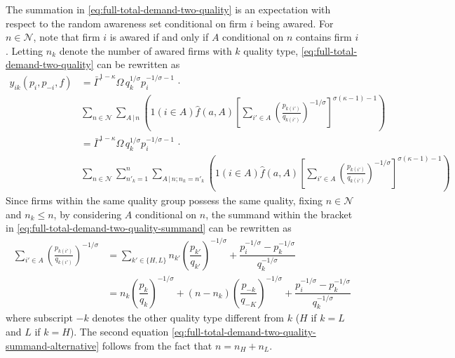 \documentclass[12pt]{article}
\begin{document}
The summation in \eqref{eq:full-total-demand-two-quality} is an expectation with respect to the random awareness set conditional on firm $i$ being awared. For $n \in \mathcal{N}$, note that firm $i$ is awared if and only if $A$ conditional on $n$ contains firm $i$. Letting $n_k$ denote the number of awared firms with $k$ quality type, \eqref{eq:full-total-demand-two-quality} can be rewritten as
\begin{align}
	y_{ik}(p_i, p_{-i}, f) &= \bar{\Gamma}^{1-\kappa}\Omega \, q_k^{1/\sigma}p_i^{-1/\sigma - 1}\, \cdot \\ 
	& \sum_{n \in \mathcal{N} }  \sum_{{A}\,|\,n}\left( 1( i \in A ) \hat{f}(a,A)\left[\sum_{i'\in A}\left( \frac{p_{k(i')}}{q_{k(i')}}\right)^{-1/\sigma}\right]^{\sigma (\kappa - 1)-1}\right)  \\
	&= \bar{\Gamma}^{1-\kappa}\Omega \, q_k^{1/\sigma}p_i^{-1/\sigma - 1}\, \cdot \\ 
	&\sum_{n \in \mathcal{N} } \sum_{n'_k =1}^n \sum_{{A}\,|\,n; n_k = n'_k}\left( 1( i \in A ) \hat{f}(a,A)\left[\sum_{i'\in A}\left( \frac{p_{k(i')}}{q_{k(i')}}\right)^{-1/\sigma}\right]^{\sigma (\kappa - 1)-1}\right)  
	\label{eq:full-total-demand-two-quality-summand}
\end{align}
Since firms within the same quality group possess the same quality, fixing $n \in \mathcal{N}$ and $n_k \leq n$, by considering $A$ conditional on $n$, the summand within the bracket in \cref{eq:full-total-demand-two-quality-summand} can be rewritten as 
\begin{align}
\sum_{i'\in A}\left( \frac{p_{k(i')}}{q_{k(i')}}\right)^{-1/\sigma} &= \sum_{k' \in \{H, L\} } n_{k'} \left( \dfrac{p_{k'}}{q_{k'}}  \right)^{-1/\sigma} +   
\dfrac{p_i^{-1/\sigma} - p^{-1/\sigma}_{k} }{ q_k^{-1/\sigma }} \\
&= n_k \left( \dfrac{p_{k}}{q_{k}}   \right)^{-1/\sigma} +  
(n - n_k) \left( \dfrac{p_{-k}}{q_{-K}}   \right)^{-1/\sigma} +
\dfrac{p_i^{-1/\sigma} - p^{-1/\sigma}_{k} }{ q_k^{-1/\sigma }}  \label{eq:full-total-demand-two-quality-summand-alternative}
\end{align}
where subscript $-k$ denotes the other quality type different from $k$ ($H$ if $k = L$ and $L$ if $k = H$). The second equation \eqref{eq:full-total-demand-two-quality-summand-alternative} follows from the fact that $n = n_H + n_L$.
\end{document}
